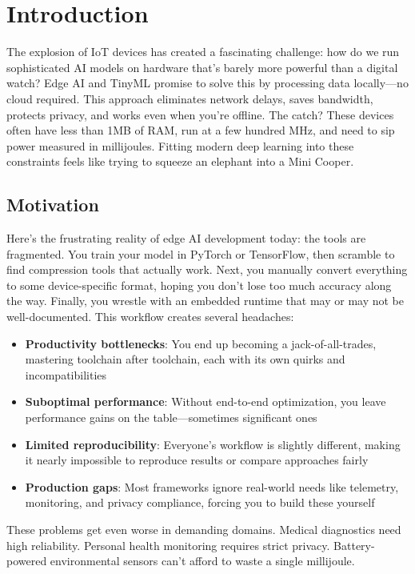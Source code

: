 \section{Introduction}

The explosion of IoT devices has created a fascinating challenge: how do we run sophisticated AI models on hardware that's barely more powerful than a digital watch? Edge AI and TinyML \cite{warden2019tinyml} promise to solve this by processing data locally—no cloud required. This approach eliminates network delays, saves bandwidth, protects privacy, and works even when you're offline. The catch? These devices often have less than 1MB of RAM, run at a few hundred MHz, and need to sip power measured in millijoules. Fitting modern deep learning into these constraints feels like trying to squeeze an elephant into a Mini Cooper.

\subsection{Motivation}

Here's the frustrating reality of edge AI development today: the tools are fragmented. You train your model in PyTorch or TensorFlow, then scramble to find compression tools that actually work. Next, you manually convert everything to some device-specific format, hoping you don't lose too much accuracy along the way. Finally, you wrestle with an embedded runtime that may or may not be well-documented. This workflow creates several headaches:

\begin{itemize}
\item \textbf{Productivity bottlenecks}: You end up becoming a jack-of-all-trades, mastering toolchain after toolchain, each with its own quirks and incompatibilities
\item \textbf{Suboptimal performance}: Without end-to-end optimization, you leave performance gains on the table—sometimes significant ones
\item \textbf{Limited reproducibility}: Everyone's workflow is slightly different, making it nearly impossible to reproduce results or compare approaches fairly
\item \textbf{Production gaps}: Most frameworks ignore real-world needs like telemetry, monitoring, and privacy compliance, forcing you to build these yourself
\end{itemize}

These problems get even worse in demanding domains. Medical diagnostics need high reliability. Personal health monitoring requires strict privacy. Battery-powered environmental sensors can't afford to waste a single millijoule.

